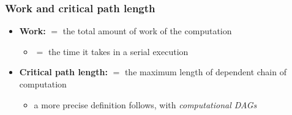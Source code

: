 \documentclass[12pt,dvipdfmx]{beamer}
\newcommand{\ao}[1]{{\color{blue}#1}}
\begin{document}
\begin{frame}[fragile]
\frametitle{Work and critical path length}
\begin{itemize}
\item \ao{\textbf{Work:}} $=$ the total amount of work of the computation
  \begin{itemize}
  \item $=$ the time it takes in a serial execution
  \end{itemize}

\item \ao{\textbf{Critical path length:}} 
  $=$ the maximum length of dependent chain of computation 
  \begin{itemize}
  \item a more precise definition follows, 
    with \ao{\em computational DAGs}
  \end{itemize}
\end{itemize}
\end{frame}
\end{document}
